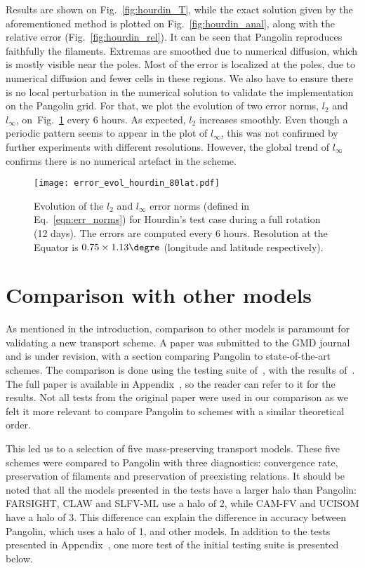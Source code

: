 Results are shown on Fig.~\ref{fig:hourdin_T}, while the exact solution given by
the aforementioned method is plotted on Fig.~\ref{fig:hourdin_anal}, along with
the relative error (Fig.~\ref{fig:hourdin_rel}). It can be seen that Pangolin
reproduces faithfully the filaments. Extremas are smoothed due to numerical
diffusion, which is mostly visible near the poles. Most of the error is
localized at the poles, due to numerical diffusion and fewer cells in these
regions.  We also have to ensure there is no local perturbation in the numerical
solution to validate the implementation on the Pangolin grid. For that, we plot
the evolution of two error norms, $l_2$ and $l_{\infty}$,
on~Fig.~\ref{fig:error_hourdin} every 6 hours. As expected, $l_2$ increases
smoothly. Even though a periodic pattern seems to appear in the plot of
$l_{\infty}$, this was not confirmed by further experiments with different
resolutions. However, the global trend of $l_{\infty}$ confirms there is no
numerical artefact in the scheme.
\begin{figure}
  \centering
  \texttt{[image: error\_evol\_hourdin\_80lat.pdf]}
  \caption{Evolution of the $l_2$ and $l_{\infty}$ error norms (defined in
  Eq.~\eqref{eqn:err_norms}) for Hourdin's test case during a full rotation (12
  days). The errors are computed every 6 hours. Resolution at the Equator is 
  $0.75\times1.13\degre$ (longitude and latitude respectively).}
  \label{fig:error_hourdin}
\end{figure}

\section{Comparison with other models}
\label{sec:comparison}
As mentioned in the introduction, comparison to other models is paramount for
validating a new transport scheme. A paper was submitted to the \gls{GMD}
journal and is under revision, with a section comparing Pangolin to state-of-the-art schemes. The
comparison is done using the testing suite of~\cite{Lauritzen2012}, with the
results of~\cite{Lauritzen2014}. The full paper is available in
Appendix~\DIFdelbegin \DIFdel{\ref{sec:tests}}\DIFdelend \DIFaddbegin \DIFadd{\ref{sec2:tests}}\DIFaddend , so the reader can refer to it for the
results. Not all tests from the original paper were used in our comparison as we
felt it more relevant to compare Pangolin to schemes with a similar theoretical
order. 

This led us to a selection of five mass-preserving transport models. These 
five schemes were compared to Pangolin with three diagnostics: convergence
rate, preservation of filaments and preservation of preexisting
relations. It should be noted that all the models presented in the tests have a
larger halo than Pangolin: FARSIGHT, CLAW and SLFV-ML use a halo of 2, while
CAM-FV and UCISOM have a halo of 3. This difference can explain the difference
in accuracy between Pangolin, which uses a halo of 1, and other models.
In addition to the tests presented in Appendix~\DIFdelbegin \DIFdel{\ref{sec:tests}}\DIFdelend \DIFaddbegin \DIFadd{\ref{sec2:tests}}\DIFaddend , one more test
of the initial testing suite is presented below.


